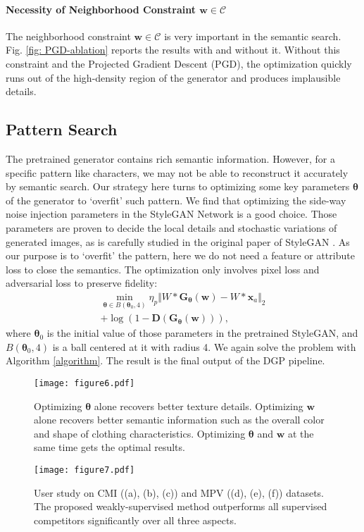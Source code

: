 \documentclass[10pt,twocolumn,letterpaper]{article}
\newcommand{\G}{\bm{G}}
\newcommand{\D}{\bm{D}}
\newcommand{\w}{\bm{w}}
\newcommand{\x}{\bm{x}}
\begin{document}
\paragraph{Necessity of Neighborhood Constraint $\w\in\mathcal{C}$} The neighborhood constraint $\w\in\mathcal{C}$ is very important in the semantic search. Fig. \ref{fig: PGD-ablation} reports the results with and without it. Without this constraint and the Projected Gradient Descent (PGD), the optimization quickly runs out of the high-density region of the generator and produces implausible details.

\subsection{Pattern Search}
The pretrained generator contains rich semantic information. However, for a specific pattern like characters, we may not be able to reconstruct it accurately by semantic search. Our strategy here turns to optimizing some key parameters $\bm{\theta}$ of the generator to `overfit' such pattern. We find that optimizing the side-way noise injection parameters \cite{karras2019style,abdal2019image2stylegan,abdal2020image2stylegan++} in the StyleGAN Network is a good choice. Those parameters are proven to decide the local details and stochastic variations of generated images, as is carefully studied in the original paper of StyleGAN \cite{karras2020analyzing,karras2019style}. As our purpose is to `overfit' the pattern, here we do not need a feature or attribute loss to close the semantics. The optimization only involves pixel loss and adversarial loss to preserve fidelity:\begin{equation}
    \begin{aligned}
        \min_{\bm{\theta}\in B(\bm{\theta}_0,4)}\eta_p\Vert W*\G_{\bm{\theta}}(\w)-W*\x_a\Vert_2\\
        +\log(1-\D(\G_{\bm{\theta}}(\w))),
    \end{aligned}\end{equation}
where $\bm{\theta}_0$ is the initial value of those parameters in the pretrained StyleGAN, and $B(\bm{\theta}_0,4)$ is a ball centered at it with radius 4. We again solve the problem with Algorithm \ref{algorithm}. The result is the final output of the DGP pipeline. 

\begin{figure}[t]
  \centering
  \texttt{[image: figure6.pdf]}\caption{Optimizing $\bm{\theta}$ alone recovers better texture details.
Optimizing $\w$ alone recovers better semantic information such as the overall color and shape of clothing characteristics. Optimizing $\bm{\theta}$ and $\w$ at the same time gets the optimal results.}\label{fig: figure_without_w_or_n}\end{figure}
\begin{figure}[t]
  \centering
  \texttt{[image: figure7.pdf]}\caption{User study on CMI ((a), (b), (c)) and MPV ((d), (e), (f)) datasets. The proposed weakly-supervised method outperforms all supervised competitors significantly over all three aspects.}\label{fig: figure_user_study_CMI}\end{figure}
\end{document}

